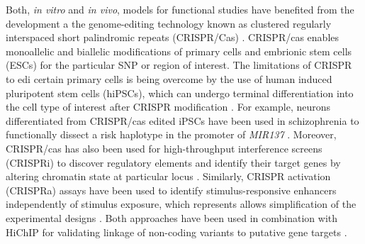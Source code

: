 Both, \textit{in vitro} and \textit{in vivo}, models for functional studies have benefited from the development a the genome-editing technology known as clustered regularly interspaced short palindromic repeats (CRISPR/Cas) \parencite{Cong2013}. CRISPR/cas enables monoallelic and biallelic modifications of primary cells and embrionic stem cells (ESCs) for the particular SNP or region of interest. The limitations of CRISPR to edi certain primary cells is being overcome by the use of human induced pluripotent stem cells (hiPSCs), which can undergo terminal differentiation into the cell type of interest after CRISPR modification \parencite{Ding2013}. For example, neurons differentiated from CRISPR/cas edited iPSCs have been used in schizophrenia to functionally dissect a risk haplotype in the promoter of \textit{MIR137} \parencite{Forrest2017}.  %
Moreover, CRISPR/cas has also been used for high-throughput interference screens (CRISPRi) to discover regulatory elements and identify their target genes by altering chromatin state at particular locus . Similarly, CRISPR activation (CRISPRa) assays have been used to identify stimulus-responsive enhancers independently of stimulus exposure, which represents allows simplification of the experimental designs \parencite{Simeonov2017}. Both approaches have been used in combination with HiChIP for validating linkage of non-coding variants to putative gene targets \parencite{Mumbach2017}.






